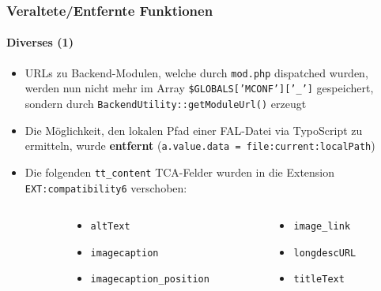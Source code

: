\begin{frame}[fragile]
	\frametitle{Veraltete/Entfernte Funktionen}
	\framesubtitle{Diverses (1)}

	\begin{itemize}

		\item URLs zu Backend-Modulen, welche durch \texttt{mod.php} dispatched wurden,
			werden nun nicht mehr im Array
			\small\texttt{\$GLOBALS['MCONF']['\_']}\normalsize\space
			gespeichert, sondern durch
			\small\texttt{BackendUtility::getModuleUrl()}\normalsize\space
			erzeugt

		\item Die Möglichkeit, den lokalen Pfad einer FAL-Datei via TypoScript zu ermitteln,
			wurde \textbf{entfernt}\newline
			\small(\texttt{a.value.data = file:current:localPath})\normalsize

		\item Die folgenden \texttt{tt\_content} TCA-Felder wurden in die Extension
			\texttt{EXT:compatibility6} verschoben:

	\end{itemize}

	\vspace{-0.2cm}

	\begin{columns}[T]
		\begin{column}{.06\textwidth}
		\end{column}
		\begin{column}{.47\textwidth}
			\smaller
			\begin{itemize}
				\item \texttt{altText}
				\item \texttt{imagecaption}
				\item \texttt{imagecaption\_position}
			\end{itemize}
			\normalsize
		\end{column}
		\begin{column}{.47\textwidth}
			\smaller
			\begin{itemize}
				\item \texttt{image\_link}
				\item \texttt{longdescURL}
				\item \texttt{titleText}
			\end{itemize}
			\normalsize
		\end{column}
	\end{columns}


\end{frame}

